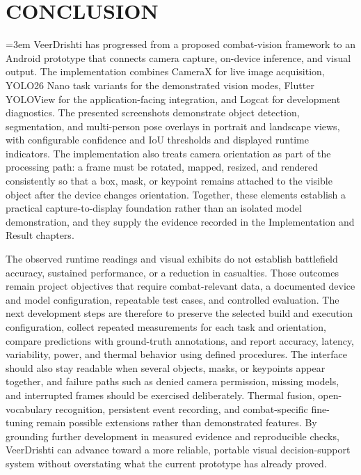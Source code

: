 \chapter{CONCLUSION}\label{ch:conclusion}
\begingroup\emergencystretch=3em
\noindent VeerDrishti has progressed from a proposed combat-vision framework to an Android prototype that
connects camera capture, on-device inference, and visual output. The implementation combines CameraX
for live image acquisition, YOLO26 Nano task variants for the demonstrated vision modes, Flutter
YOLOView for the application-facing integration, and Logcat for development diagnostics. The presented
screenshots demonstrate object detection, segmentation, and multi-person pose overlays in portrait and
landscape views, with configurable confidence and IoU thresholds and displayed runtime indicators. The
implementation also treats camera orientation as part of the processing path: a frame must be rotated,
mapped, resized, and rendered consistently so that a box, mask, or keypoint remains attached to the
visible object after the device changes orientation. Together, these elements establish a practical
capture-to-display foundation rather than an isolated model demonstration, and they supply the
evidence recorded in the Implementation and Result chapters.

The observed runtime readings and visual exhibits do not establish battlefield accuracy, sustained
performance, or a reduction in casualties. Those outcomes remain project objectives that require
combat-relevant data, a documented device and model configuration, repeatable test cases, and controlled
evaluation. The next development steps are therefore to preserve the selected build and execution
configuration, collect repeated measurements for each task and orientation, compare predictions with
ground-truth annotations, and report accuracy, latency, variability, power, and thermal behavior using
defined procedures. The interface should also stay readable when several objects, masks, or keypoints
appear together, and failure paths such as denied camera permission, missing models, and interrupted
frames should be exercised deliberately. Thermal fusion, open-vocabulary recognition, persistent event
recording, and combat-specific fine-tuning remain possible extensions rather than demonstrated features. By grounding further development in measured evidence and
reproducible checks, VeerDrishti can advance toward a more reliable, portable visual decision-support
system without overstating what the current prototype has already proved.
\label{end:conclusion}
\par\endgroup
